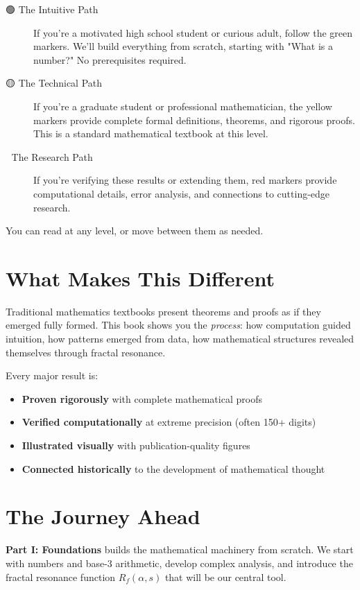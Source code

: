 \begin{description}
\item[🟢 The Intuitive Path] If you're a motivated high school student or curious adult, follow the green markers. We'll build everything from scratch, starting with "What is a number?" No prerequisites required.

\item[🟡 The Technical Path] If you're a graduate student or professional mathematician, the yellow markers provide complete formal definitions, theorems, and rigorous proofs. This is a standard mathematical textbook at this level.

\item[🔴 The Research Path] If you're verifying these results or extending them, red markers provide computational details, error analysis, and connections to cutting-edge research.
\end{description}

You can read at any level, or move between them as needed.

\section*{What Makes This Different}

Traditional mathematics textbooks present theorems and proofs as if they emerged fully formed. This book shows you the \textit{process}: how computation guided intuition, how patterns emerged from data, how mathematical structures revealed themselves through fractal resonance.

Every major result is:
\begin{itemize}
\item \textbf{Proven rigorously} with complete mathematical proofs
\item \textbf{Verified computationally} at extreme precision (often 150+ digits)
\item \textbf{Illustrated visually} with publication-quality figures
\item \textbf{Connected historically} to the development of mathematical thought
\end{itemize}

\section*{The Journey Ahead}

\textbf{Part I: Foundations} builds the mathematical machinery from scratch. We start with numbers and base-3 arithmetic, develop complex analysis, and introduce the fractal resonance function $R_f(\alpha, s)$ that will be our central tool.

